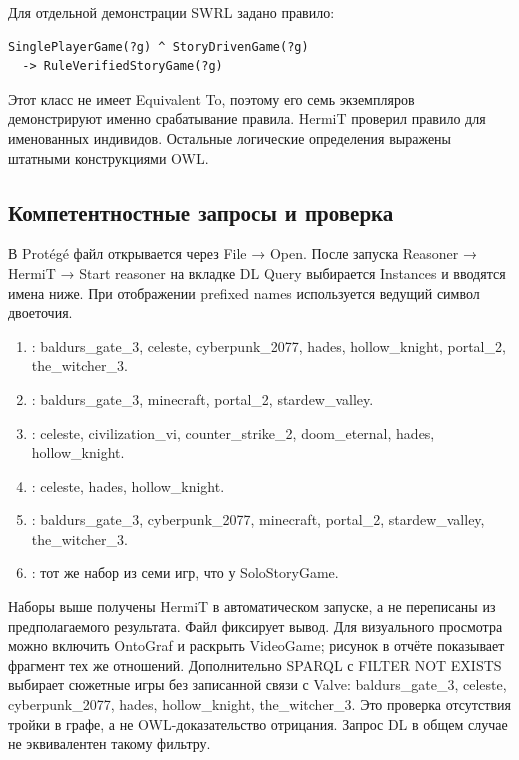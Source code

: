 Для отдельной демонстрации SWRL задано правило:
\begin{lstlisting}
SinglePlayerGame(?g) ^ StoryDrivenGame(?g)
  -> RuleVerifiedStoryGame(?g)
\end{lstlisting}
Этот класс не имеет Equivalent To, поэтому его семь экземпляров демонстрируют
именно срабатывание правила. HermiT проверил правило для именованных индивидов.
Остальные логические определения выражены штатными конструкциями OWL.

\subsection{Компетентностные запросы и проверка}
В Protégé файл открывается через File → Open. После запуска Reasoner → HermiT →
Start reasoner на вкладке DL Query выбирается Instances и вводятся имена ниже.
При отображении prefixed names используется ведущий символ двоеточия.

\begin{enumerate}[leftmargin=*]
\item {}: baldurs\_gate\_3, celeste, cyberpunk\_2077, hades,
hollow\_knight, portal\_2, the\_witcher\_3.
\item {}: baldurs\_gate\_3, minecraft, portal\_2, stardew\_valley.
\item {}: celeste, civilization\_vi, counter\_strike\_2,
doom\_eternal, hades, hollow\_knight.
\item {}: celeste, hades, hollow\_knight.
\item {}: baldurs\_gate\_3, cyberpunk\_2077,
minecraft, portal\_2, stardew\_valley, the\_witcher\_3.
\item {}: тот же набор из семи игр, что у SoloStoryGame.
\end{enumerate}

Наборы выше получены HermiT в автоматическом запуске, а не переписаны
из предполагаемого результата. Файл  фиксирует вывод.
Для визуального просмотра можно включить OntoGraf и раскрыть VideoGame;
рисунок в отчёте показывает фрагмент тех же отношений.
Дополнительно SPARQL с FILTER NOT EXISTS выбирает сюжетные игры без записанной
связи с Valve: baldurs\_gate\_3, celeste, cyberpunk\_2077, hades, hollow\_knight,
the\_witcher\_3. Это проверка отсутствия тройки в графе, а не OWL-доказательство
отрицания. Запрос DL  в общем случае
не эквивалентен такому фильтру.
